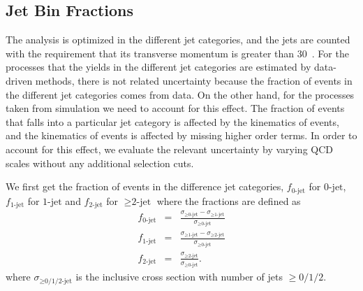 \subsection{Jet Bin Fractions}
\label{sec:jetbinfrac}

The analysis is optimized in the different jet categories, 
and the jets are counted with the requirement that  
its transverse momentum is greater than 30~\GeV. For the processes that the yields in the 
different jet categories are estimated by data-driven methods, there is not related uncertainty 
because the fraction of events in the different jet categories comes from data. 
On the other hand, for the processes taken from simulation we need to account for this effect.    
The fraction of events that falls into a particular jet category is 
affected by the kinematics of events, and the kinematics of events is affected 
by missing higher order terms. 
In order to account for this effect, we evaluate the relevant uncertainty by varying 
QCD scales without any additional selection cuts.

We first get the fraction of events in the difference jet categories, 
$f_\textrm{0-jet}$ for $\textrm{0-jet}$, $f_\textrm{1-jet}$ for $\textrm{1-jet}$ 
and $f_\textrm{2-jet}$ for $\ge\textrm{2-jet}$ where the fractions are defined as 
\begin{eqnarray} 
f_\textrm{0-jet} 
&=&  
\frac{\sigma_{\ge\textrm{0-jet}} - \sigma_{\ge\textrm{1-jet}}}{\sigma_{\ge\textrm{0-jet}}} \\
f_\textrm{1-jet} 
&=&  
\frac{\sigma_{\ge\textrm{1-jet}} - \sigma_{\ge\textrm{2-jet}}}{\sigma_{\ge\textrm{0-jet}}} \\
f_\textrm{2-jet} 
&=&  
\frac{\sigma_{\ge\textrm{2-jet}}}{\sigma_{\ge\textrm{0-jet}}}.
\end{eqnarray}  
where $\sigma_{\ge\textrm{0/1/2-jet}}$ is the inclusive cross section 
with number of jets $\ge 0/1/2$.

